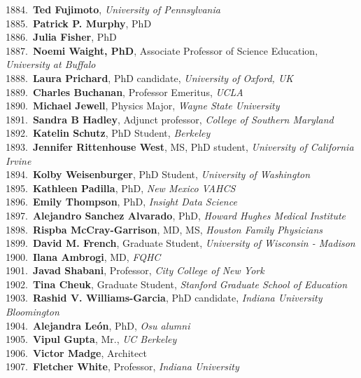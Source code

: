 1884.~{\bf Ted Fujimoto}, {\sl University of Pennsylvania} \\
1885.~{\bf Patrick P. Murphy}, PhD \\
1886.~{\bf Julia Fisher}, PhD \\
1887.~{\bf Noemi Waight, PhD}, Associate Professor of Science Education, {\sl University at Buffalo} \\
1888.~{\bf Laura Prichard}, PhD candidate, {\sl University of Oxford, UK} \\
1889.~{\bf Charles Buchanan}, Professor Emeritus, {\sl UCLA} \\
1890.~{\bf Michael Jewell}, Physics Major, {\sl Wayne State University} \\
1891.~{\bf Sandra B Hadley}, Adjunct professor, {\sl College of Southern Maryland} \\
1892.~{\bf Katelin Schutz}, PhD Student, {\sl Berkeley} \\
1893.~{\bf Jennifer Rittenhouse West}, MS, PhD student, {\sl University of California Irvine} \\
1894.~{\bf Kolby Weisenburger}, PhD Student, {\sl University of Washington} \\
1895.~{\bf Kathleen Padilla}, PhD, {\sl New Mexico VAHCS} \\
1896.~{\bf Emily Thompson}, PhD, {\sl Insight Data Science} \\
1897.~{\bf Alejandro Sanchez Alvarado}, PhD, {\sl Howard Hughes Medical Institute} \\
1898.~{\bf Rispba McCray-Garrison}, MD, MS, {\sl Houston Family Physicians } \\
1899.~{\bf David M. French}, Graduate Student, {\sl University of Wisconsin - Madison} \\
1900.~{\bf Ilana Ambrogi}, MD, {\sl FQHC} \\
1901.~{\bf Javad Shabani}, Professor, {\sl City College of New York} \\
1902.~{\bf Tina Cheuk}, Graduate Student, {\sl Stanford Graduate School of Education} \\
1903.~{\bf Rashid V. Williams-Garcia}, PhD candidate, {\sl Indiana University Bloomington} \\
1904.~{\bf Alejandra Le\'{o}n}, PhD, {\sl Osu alumni} \\
1905.~{\bf Vipul Gupta}, Mr., {\sl UC Berkeley} \\
1906.~{\bf Victor Madge}, Architect \\
1907.~{\bf Fletcher White}, Professor, {\sl Indiana University} \\
